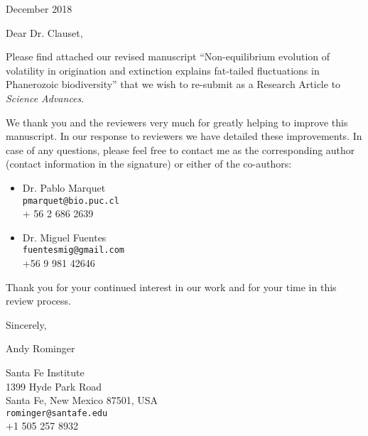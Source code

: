 \documentclass[12pt]{article}
\begin{document}
 December 2018

\vspace{2em}

\noindent
Dear Dr. Clauset,
\vspace{2em}

Please find attached our revised manuscript ``Non-equilibrium
evolution of volatility in origination and extinction explains
fat-tailed fluctuations in Phanerozoic biodiversity'' that we wish to
re-submit as a Research Article to {\it Science Advances}.

We thank you and the reviewers very much for greatly helping to
improve this manuscript.  In our response to reviewers we have
detailed these improvements. In case of any questions, please feel
free to contact me as the corresponding author (contact information in
the signature) or either of the co-authors:

\begin{itemize}
\item[] Dr. Pablo Marquet \\
{\tt pmarquet@bio.puc.cl} \\
+ 56 2 686 2639
\item[] Dr. Miguel Fuentes \\
{\tt fuentesmig@gmail.com} \\
+56 9 981 42646
\end{itemize}

Thank you for your continued interest in our work and for your time in
this review process.
\vspace{2em}

\noindent
Sincerely,
\vspace{2em}

\noindent
Andy Rominger

\noindent
Santa Fe Institute \\
1399 Hyde Park Road \\
Santa Fe, New Mexico 87501, USA \\
{\tt rominger@santafe.edu} \\
+1 505 257 8932
\end{document}

